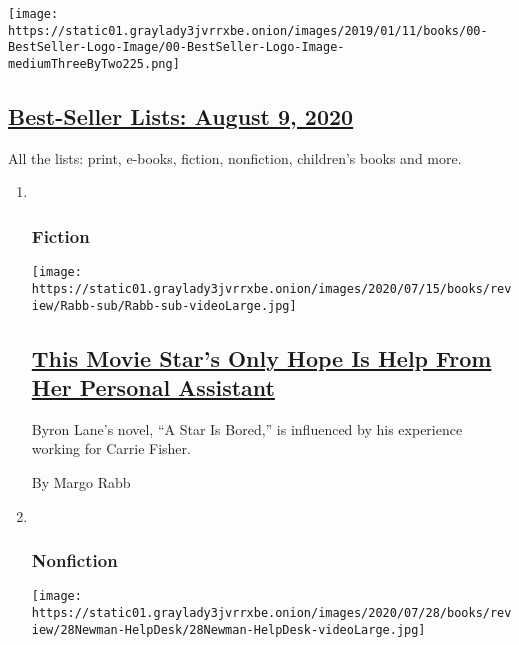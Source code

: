 \begin{enumerate}
  \texttt{[image: https://static01.graylady3jvrrxbe.onion/images/2019/01/11/books/00-BestSeller-Logo-Image/00-BestSeller-Logo-Image-mediumThreeByTwo225.png]}

  \hypertarget{best-seller-lists-august-9-2020}{%
  \subsection{\texorpdfstring{\href{/interactive/2020/01/29/books/review/best-sellers-promo-for-front-copy2.html}{Best-Seller
  Lists: August 9,
  2020}}{Best-Seller Lists: August 9, 2020}}\label{best-seller-lists-august-9-2020}}

  All the lists: print, e-books, fiction, nonfiction, children's books
  and more.
\end{enumerate}

\begin{enumerate}
\def\labelenumi{\arabic{enumi}.}
\item ~
  \hypertarget{fiction-1}{%
  \subsubsection{Fiction}\label{fiction-1}}

  \texttt{[image: https://static01.graylady3jvrrxbe.onion/images/2020/07/15/books/review/Rabb-sub/Rabb-sub-videoLarge.jpg]}

  \hypertarget{this-movie-stars-only-hope-is-help-from-her-personal-assistant}{%
  \subsection{\texorpdfstring{\href{/2020/07/28/books/review/a-star-is-bored-byron-lane.html}{This
  Movie Star's Only Hope Is Help From Her Personal
  Assistant}}{This Movie Star's Only Hope Is Help From Her Personal Assistant}}\label{this-movie-stars-only-hope-is-help-from-her-personal-assistant}}

  Byron Lane's novel, ``A Star Is Bored,'' is influenced by his
  experience working for Carrie Fisher.

  By Margo Rabb
\item ~
  \hypertarget{nonfiction-3}{%
  \subsubsection{Nonfiction}\label{nonfiction-3}}

  \texttt{[image: https://static01.graylady3jvrrxbe.onion/images/2020/07/28/books/review/28Newman-HelpDesk/28Newman-HelpDesk-videoLarge.jpg]}


\end{enumerate}
